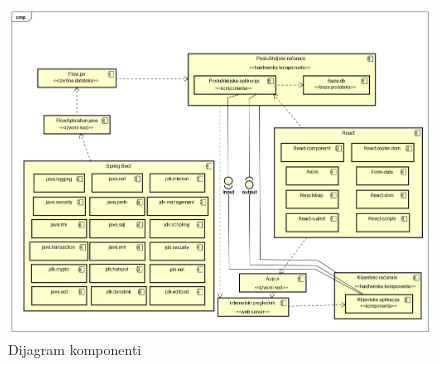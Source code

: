 		
		\begin{figure}
			\centering
			\includegraphics[scale=0.3]{dijagrami/dijagramKomponenti.jpg}
			\caption{Dijagram komponenti}
		\end{figure}